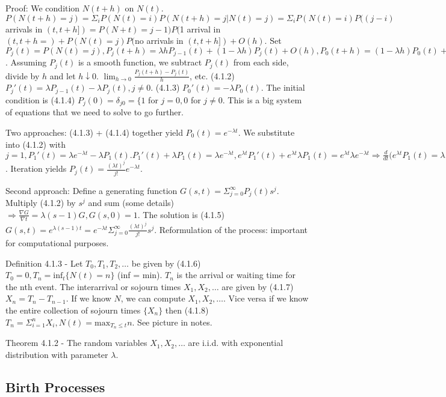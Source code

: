 \documentclass{article}
\begin{document}
Proof: We condition $N(t+h)$ on $N(t)$. $P(N(t+h) = j) = \Sigma_i P(N(t) = i)P(N(t+h) = j| N(t) = j) = \Sigma_i P(N(t)=i)P((j-i)$ arrivals in $(t, t+h]) = P(N+t) = j-1)P($1 arrival in $(t, t+h=) + P(N(t) = j) P($no arrivals in $(t, t+h]) + O(h)$. Set $P_j(t) = P(N(t) = j), P_j(t+h) = \lambda h P_{j-1}(t) + (1 - \lambda h) P_j(t) + O(h), P_0(t+h) = (1-\lambda h)P_0(t) + O(h), j \ne 0$. Assuming $P_j(t)$ is a smooth function, we subtract $P_j(t)$ from each side, divide by $h$ and let $h \downarrow 0$. $\lim_{h \rightarrow 0}\frac{P_j(t+h) - P_j(t)}{h}$, etc. (4.1.2) $P_j'(t) = \lambda P_{j-1}(t) - \lambda P_j(t), j \ne 0$. (4.1.3) $P_0'(t) = -\lambda P_0(t)$. The initial condition is (4.1.4) $P_j(0) = \delta_{j0} = \{1$ for $j = 0, 0$ for $j \ne 0$. This is a big system of equations that we need to solve to go further.

Two approaches: (4.1.3) + (4.1.4) together yield $P_0(t) = e^{-\lambda t}$. We substitute into (4.1.2) with $j = 1, P_1'(t) = \lambda e^{-\lambda t} - \lambda P_1(t). P_1'(t) + \lambda P_1(t) = \lambda e^{-\lambda t}, e^{\lambda t} P_1'(t) + e^{\lambda t} \lambda P_1(t) = e^{\lambda t} \lambda e ^{-\lambda t} \Rightarrow \frac{d}{dt}(e^{\lambda t}P_1(t) = \lambda, e^{\lambda t}P_1(t) = \lambda t + c \Rightarrow P_1(t) = \lambda t e^{-\lambda t}$. Iteration yields $P_j(t) = \frac{(\lambda t)^j}{j!} e^{-\lambda t}$.

Second approach: Define a generating function $G(s, t) = \Sigma_{j=0}^\infty P_j(t) s^j$. Multiply (4.1.2) by $s^j$ and sum (some details) $\Rightarrow \frac{\nabla G}{\nabla t} = \lambda(s-1) G, G(s, 0) = 1$. The solution is (4.1.5) $G(s, t) = e^{\lambda(s-1)t} = e^{-\lambda t} \Sigma_{j=0}^\infty \frac{(\lambda t)^j}{j!}s^j$. Reformulation of the process: important for computational purposes.

Definition 4.1.3 - Let $T_0, T_1, T_2, \dots$ be given by (4.1.6) $T_0 = 0, T_n = \mathrm{inf}_t \{N(t) = n\}$ (inf = min). $T_n$ is the arrival or waiting time for the nth event. The interarrival or sojourn times $X_1, X_2, \dots$ are given by (4.1.7) $X_n = T_n - T_{n-1}$. If we know $N$, we can compute $X_1, X_2, \dots$. Vice versa if we know the entire collection of sojourn times $\{X_n\}$ then (4.1.8) $T_n = \Sigma_{i=1}^n X_i, N(t) = \mathrm{max}_{T_n \le t} n$. See picture in notes.

Theorem 4.1.2 - The random variables $X_1, X_2, \dots$ are i.i.d. with exponential distribution with parameter $\lambda$.

\subsection{Birth Processes}
\end{document}
